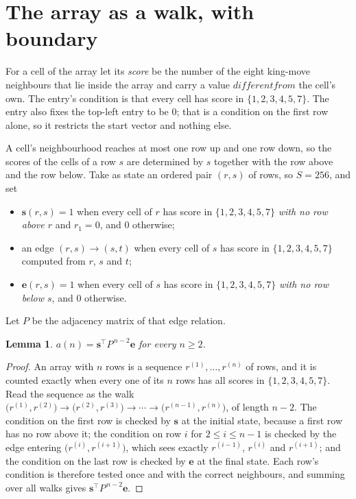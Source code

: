 \documentclass[11pt,a4paper]{article}
\theoremstyle{plain}
\newtheorem{lemma}[theorem]{Lemma}
\theoremstyle{definition}
\begin{document}
\section{The array as a walk, with boundary}

For a cell of the array let its \emph{score} be the number of the eight king-move neighbours that lie inside
the array and carry a value $different from$ the cell's own. The entry's condition is that every cell
has score in $\{1,2,3,4,5,7\}$. The entry also fixes the top-left entry to be $0$; that is a condition on the first row alone, so it restricts the start vector and nothing else.

A cell's neighbourhood reaches at most one row up and one row down, so the scores of the
cells of a row $s$ are determined by $s$ together with the row above and the row below.
Take as state an ordered pair $(r,s)$ of rows, so $S=256$, and set
\begin{itemize}
\item $\mathbf{s}(r,s)=1$ when every cell of $r$ has score in $\{1,2,3,4,5,7\}$ \emph{with no row
above $r$} and $r_1=0$, and $0$ otherwise;
\item an edge $(r,s)\to(s,t)$ when every cell of $s$ has score in $\{1,2,3,4,5,7\}$ computed from
$r$, $s$ and $t$;
\item $\mathbf{e}(r,s)=1$ when every cell of $s$ has score in $\{1,2,3,4,5,7\}$ \emph{with no row
below $s$}, and $0$ otherwise.
\end{itemize}
Let $P$ be the adjacency matrix of that edge relation.

\begin{lemma}\label{lem:walk}
$a(n)=\mathbf{s}^{\!\top}P^{\,n-2}\mathbf{e}$ for every $n\ge2$.
\end{lemma}

\begin{proof}
An array with $n$ rows is a sequence $r^{(1)},\dots,r^{(n)}$ of rows, and it is counted
exactly when every one of its $n$ rows has all scores in $\{1,2,3,4,5,7\}$. Read the sequence as the
walk $\bigl(r^{(1)},r^{(2)}\bigr)\to\bigl(r^{(2)},r^{(3)}\bigr)\to\cdots\to
\bigl(r^{(n-1)},r^{(n)}\bigr)$, of length $n-2$. The condition on the first row is
checked by $\mathbf{s}$ at the initial state, because a first row has no row above it; the
condition on row $i$ for $2\le i\le n-1$ is checked by the edge entering
$\bigl(r^{(i)},r^{(i+1)}\bigr)$, which sees exactly $r^{(i-1)}$, $r^{(i)}$ and
$r^{(i+1)}$; and the condition on the last row is checked by $\mathbf{e}$ at the final
state. Each row's condition is therefore tested once and with the correct neighbours, and
summing over all walks gives $\mathbf{s}^{\!\top}P^{\,n-2}\mathbf{e}$.
\end{proof}
\end{document}
